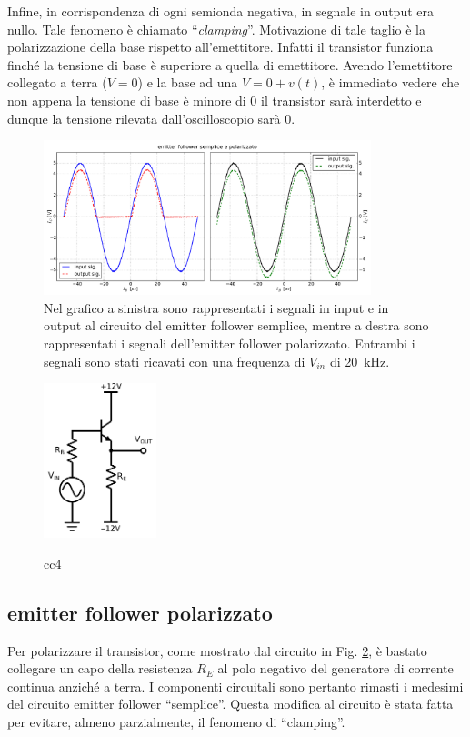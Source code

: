 Infine, in corrispondenza di ogni semionda negativa, in segnale in output era nullo.
Tale fenomeno è chiamato ``\emph{clamping}''. Motivazione di tale taglio è la polarizzazione della base rispetto all'emettitore. Infatti il transistor funziona finché la tensione di base è superiore a quella di emettitore. Avendo l'emettitore collegato a terra ($V=0$) e la base ad una $V=0+v(t)$, è immediato vedere che non appena la tensione di base è minore di 0 il transistor sarà interdetto e dunque la tensione rilevata dall'oscilloscopio sarà 0.

\begin{figure}[h]
\centering
	\includegraphics[width=0.85\textwidth]{cc3+cc4.pdf}
	\caption{Nel grafico a sinistra sono rappresentati i segnali in input e in output al circuito del emitter follower semplice, mentre a destra sono rappresentati i segnali dell'emitter follower polarizzato. Entrambi i segnali sono stati ricavati con una frequenza di $V_{in}$ di \SI{20}{\kilo\hertz}.}
	\label{fig:cc3+cc4}
\end{figure}

\begin{figure}
	\caption{cc4}
	\includegraphics[height=45mm]{cc4.pdf}
	\label{fig:cc4}
\end{figure}

\subsection{emitter follower polarizzato}
Per polarizzare il transistor, come mostrato dal circuito in Fig. \ref{fig:cc4}, è bastato collegare un capo della resistenza $R_E$ al polo negativo del generatore di corrente continua anziché a terra.
I componenti circuitali sono pertanto rimasti i medesimi del circuito emitter follower ``semplice''.
Questa modifica al circuito è stata fatta per evitare, almeno parzialmente, il fenomeno di ``clamping''.

